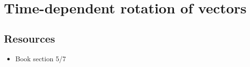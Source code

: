 %
%
%
%
%
%




\newpage
\section{Time-dependent rotation of vectors}

\subsection*{Resources}
\begin{itemize}
    \item Book section 5/7
\end{itemize}

